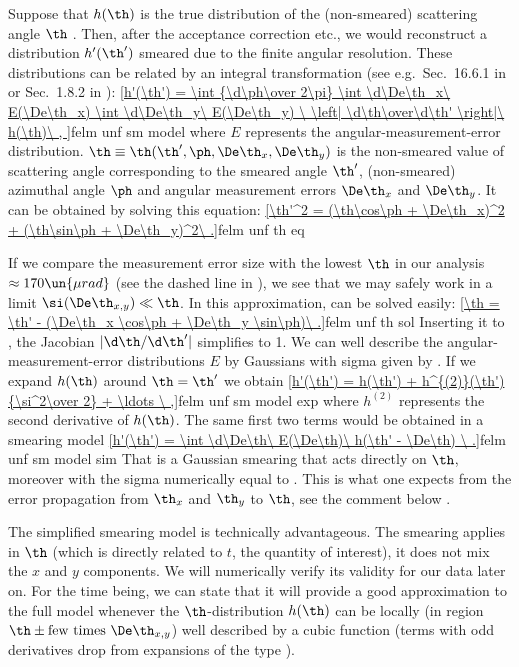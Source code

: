 Suppose that $h(\th)$ is the true distribution of the (non-smeared) scattering angle $\th$
. Then, after the acceptance correction etc., we would reconstruct a distribution $h'(\th')$ smeared due to the finite angular resolution. These distributions can be related by an integral transformation (see e.g.~Sec.~16.6.1 in  or Sec.~1.8.2 in ):
\eqref{h'(\th') = \int {\d\ph\over 2\pi} \int \d\De\th_x\ E(\De\th_x) \int \d\De\th_y\ E(\De\th_y)
	\ \left| \d\th\over\d\th' \right|\ h(\th)\ ,
}{felm unf sm model}
where $E$ represents the angular-measurement-error distribution. $\th \equiv \th(\th', \ph, \De\th_x, \De\th_y)$ is the non-smeared value of scattering angle corresponding to the smeared angle $\th'$, (non-smeared) azimuthal angle $\ph$ and angular measurement errors $\De\th_x$ and $\De\th_y$. It can be obtained by solving this equation:
\eqref{\th'^2 = (\th\cos\ph + \De\th_x)^2 + (\th\sin\ph + \De\th_y)^2\ .}{felm unf th eq}

If we compare the measurement error size  with the lowest $\th$ in our analysis $\approx 170\un{\mu rad}$ (see the dashed line in ), we see that we may safely work in a limit $\si(\De\th_{x, y}) \ll \th$. In this approximation,  can be solved easily:
\eqref{\th = \th' - (\De\th_x \cos\ph + \De\th_y \sin\ph)\ .}{felm unf th sol}
Inserting it to , the Jacobian $|\d\th/\d\th'|$ simplifies to 1. We can well describe the angular-measurement-error distributions $E$ by Gaussians with sigma given by . If we expand $h(\th)$ around $\th = \th'$ we obtain
\eqref{h'(\th') = h(\th') + h^{(2)}(\th') {\si^2\over 2} + \ldots \ ,}{felm unf sm model exp}
where $h^{(2)}$ represents the second derivative of $h(\th)$. The same first two terms would be obtained in a smearing model
\eqref{h'(\th') = \int \d\De\th\ E(\De\th)\ h(\th' - \De\th)  \ .}{felm unf sm model sim}
That is a Gaussian smearing that acts directly on $\th$, moreover with the sigma numerically equal to . This is what one expects from the error propagation from $\th_x$ and $\th_y$ to $\th$, see the comment below .

The simplified smearing model  is technically advantageous. The smearing applies in $\th$ (which is directly related to $t$, the quantity of interest), it does not mix the $x$ and $y$ components. We will numerically verify its validity for our data later on. For the time being, we can state that it will provide a good approximation to the full model  whenever the $\th$-distribution $h(\th)$ can be locally (in region $\th \pm \hbox{few times }\De\th_{x, y}$) well described by a cubic function (terms with odd derivatives drop from expansions of the type ).

